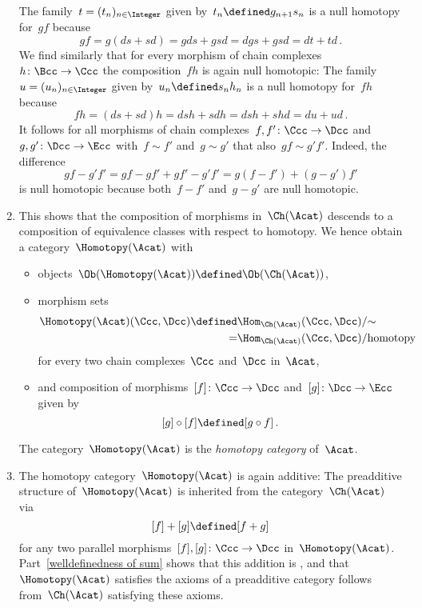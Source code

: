 \begin{remarkdefinition}
\begin{enumerate}
      The family~$t = (t_n)_{n \in \Integer}$ given by~$t_n \defined g_{n+1} s_n$ is a null homotopy for~$gf$ because
      \[
          gf
        = g(ds + sd)
        = gds + gsd
        = dgs + gsd
        = dt + td \,.
      \]
      We find similarly that for every morphism of chain complexes~$h \colon \Bcc \to \Ccc$ the composition~$fh$ is again null homotopic:
      The family~$u = (u_n)_{n \in \Integer}$ given by~$u_n \defined s_n h_n$ is a null homotopy for~$fh$ because
      \[
          fh
        = (ds + sd)h
        = dsh + sdh
        = dsh + shd
        = du + ud \,.
      \]
      It follows for all morphisms of chain complexes~$f, f' \colon \Ccc \to \Dcc$ and~$g, g' \colon \Dcc \to \Ecc$ with~$f \sim f'$ and~$g \sim g'$ that also~$gf \sim g'f'$.
      Indeed, the difference
      \[
          gf - g'f'
        = gf - gf' + gf' - g'f'
        = g(f - f') + (g - g')f'
      \]
      is null homotopic because both~$f-f'$ and~$g-g'$ are null homotopic.
    \item
      This shows that the composition of morphisms in~$\Ch(\Acat)$ descends to a composition of equivalence classes with respect to homotopy.
      We hence obtain a category~$\Homotopy(\Acat)$ with
      \begin{itemize}
        \item
          objects~$\Ob(\Homotopy(\Acat)) \defined \Ob(\Ch(\Acat))$,
        \item
          morphism sets
          \begin{align*}
                        \Homotopy(\Acat)(\Ccc, \Dcc)
            \defined&{} \Hom_{\Ch(\Acat)}(\Ccc,\Dcc)/{\sim} \\
                   =&{} \Hom_{\Ch(\Acat)}(\Ccc,\Dcc)/\text{homotopy}
          \end{align*}
          for every two chain complexes~$\Ccc$ and~$\Dcc$ in~$\Acat$,
        \item
          and composition of morphisms~$[f] \colon \Ccc \to \Dcc$ and~$[g] \colon \Dcc \to \Ecc$ given by
          \[
                      [g] \circ [f]
            \defined  [g \circ f] \,.
          \]
      \end{itemize}
      The category~$\Homotopy(\Acat)$ is the \emph{homotopy category} of~$\Acat$.
    \item
      The homotopy category~$\Homotopy(\Acat)$ is again additive:
      The preadditive structure of~$\Homotopy(\Acat)$ is inherited from the category~$\Ch(\Acat)$ via
      \[
                  [f] + [g]
        \defined  [f + g]
      \]
      for any two parallel morphisms~$[f], [g] \colon \Ccc \to \Dcc$ in~$\Homotopy(\Acat)$.
      Part~\ref{welldefinedness of sum} shows that this addition is {\welldef}, and that~$\Homotopy(\Acat)$ satisfies the axioms of a preadditive category follows from~$\Ch(\Acat)$ satisfying these axioms.
      

\end{enumerate}
\end{remarkdefinition}
